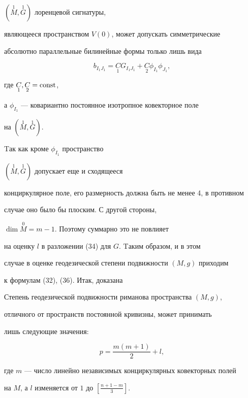 $(\overset{1}{M}{},\overset{1}{G})$ лоренцевой сигнатуры, 


являющееся пространством $V(0)$, может допускать симметрические 


абсолютно параллельные билинейные формы только лишь вида


$$


b_{I_1{}J_1}= \underset{1}{C}{} G_{I_1{}J_1}+


\underset{2}{C}{} \phi_{I_1}\phi_{J_1},


$$


где $\underset{1}{C}{},\underset{2}{C}{}=\operatorname{const}$,


а $\phi_{I_1}$ --- ковариантно постоянное изотропное ковекторное поле 


на $(\overset{1}{M}{},\overset{1}{G}{})$.


Tак как кроме $\phi_{I_1}$ пространство


$(\overset{1}{M}{},\overset{1}{G}{})$ допускает еще и сходящееся 


конциркулярное поле, его размерность должна быть не менее 4, в противном 


случае оно было бы плоским. С другой стороны,


$\dim \overset{0}{M}{}=m-1$. Поэтому суммарно это не повлияет 


на оценку $l$ в разложении (34) для $G$. Tаким образом, и в этом 


случае в оценке геодезической степени подвижности $(M,g)$ приходим 


к формулам (32), (36). Итак, доказана





\begin{thm}


Степень геодезической подвижности риманова пространства $(M,g)$, 


отличного от пространств постоянной кривизны, может принимать


лишь следующие значения$:$


$$ 


p= \frac {m(m+1)}2 +l,


$$ 


где $m$ --- число линейно независимых конциркулярных ковекторных полей 


на $M$, а $l$ изменяется от $1$ до $[\frac {n+1-m}3]$.


\end{thm}





